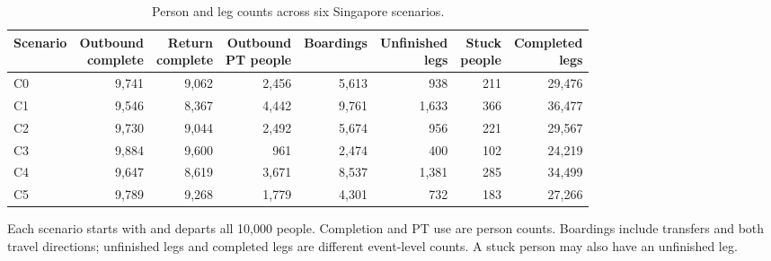 \begin{table}[pos=htbp]
\centering\footnotesize
\caption{Person and leg counts across six Singapore scenarios.}
\label{tab:singapore_person_counts}
\setlength{\tabcolsep}{3pt}
\renewcommand{\arraystretch}{1.15}
\begin{tabular}{@{}lrrrrrrr@{}}
\toprule
Scenario & \shortstack{Outbound\\complete} & \shortstack{Return\\complete} & \shortstack{Outbound\\PT people} & Boardings & \shortstack{Unfinished\\legs} & \shortstack{Stuck\\people} & \shortstack{Completed\\legs} \\
\midrule
C0 & 9,741 & 9,062 & 2,456 & 5,613 & 938 & 211 & 29,476 \\
C1 & 9,546 & 8,367 & 4,442 & 9,761 & 1,633 & 366 & 36,477 \\
C2 & 9,730 & 9,044 & 2,492 & 5,674 & 956 & 221 & 29,567 \\
C3 & 9,884 & 9,600 & 961 & 2,474 & 400 & 102 & 24,219 \\
C4 & 9,647 & 8,619 & 3,671 & 8,537 & 1,381 & 285 & 34,499 \\
C5 & 9,789 & 9,268 & 1,779 & 4,301 & 732 & 183 & 27,266 \\
\bottomrule
\end{tabular}
\par\smallskip\begin{minipage}{0.98\textwidth}\footnotesize Each scenario starts with and departs all 10,000 people. Completion and PT use are person counts. Boardings include transfers and both travel directions; unfinished legs and completed legs are different event-level counts. A stuck person may also have an unfinished leg.\end{minipage}
\end{table}
